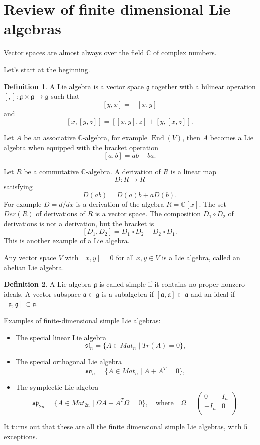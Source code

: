 \documentclass[12pt]{article}
\theoremstyle{plain}
\theoremstyle{definition}
\newtheorem{defn}{Definition}[section]
\numberwithin{equation}{section}
\DeclareMathOperator{\en}{End}
\newcommand{\C}{\mathbb{C}}
\newcommand{\g}{\mathfrak{g}}
\newcommand{\ma}{\mathfrak{a}}
\newcommand{\tbt}[4]{\left(\begin{array}{cc} #1 & #2 \\ #3 & #4 \\ \end{array}\right)}
\begin{document}
\section{Review of finite dimensional Lie algebras}

Vector spaces are almost always over the field $\C$ of complex numbers.

Let's start at the beginning.
\begin{defn}
A Lie algebra is a vector space $\g$ together with a bilinear operation $[,] : \g \times \g \rightarrow \g$ such that
\[
[y, x] = -[x, y]
\]
and
\[
[x, [y, z]] = [[x, y], z] + [y, [x, z]].
\]
\end{defn}

Let $A$ be an associative $\C$-algebra, for example $\en(V)$, then $A$ becomes a Lie algebra when equipped with the bracket operation
\[
[a, b] = ab - ba.
\]

Let $R$ be a commutative $\C$-algebra. A derivation of $R$ is a linear map
\[
D : R \rightarrow R
\]
satisfying
\[
D(ab) = D(a)b + aD(b).
\]
For example $D = d/dx$ is a derivation of the algebra $R = \C[x]$.
The set $Der(R)$ of derivations of $R$ is a vector space. The composition $D_1 \circ D_2$ of derivations is not a derivation, but the bracket is
\[
[D_1, D_2] = D_1 \circ D_2 - D_2 \circ D_1.
\]
This is another example of a Lie algebra.


Any vector space $V$ with $[x, y] = 0$ for all $x, y \in V$ is a Lie algebra, called an abelian Lie algebra.

\begin{defn}
A Lie algebra $\g$ is called simple if it contains no proper nonzero ideals. A vector subspace $\ma \subset \g$ is a subalgebra if $[\ma, \ma] \subset \ma$ and an ideal if $[\ma, \g] \subset \ma$.
\end{defn}



Examples of finite-dimensional simple Lie algebras:
\begin{itemize}
\item The special linear Lie algebra
\[
\mathfrak{sl}_n = \{A \in Mat_{n} \mid Tr(A) = 0 \},
\]

\item The special orthogonal Lie algebra
\[
\mathfrak{so}_n = \{A \in Mat_{n} \mid A + A^T = 0\},
\]

\item The symplectic Lie algebra
\[
\mathfrak{sp}_{2n} = \{A \in Mat_{2n} \mid \Omega A + A^T \Omega = 0\}, \quad \text{where} \quad \Omega = \tbt{0}{I_n}{-I_n}{0}.
\]
\end{itemize}
It turns out that these are all the finite dimensional simple Lie algebras, with $5$ exceptions.
\end{document}
